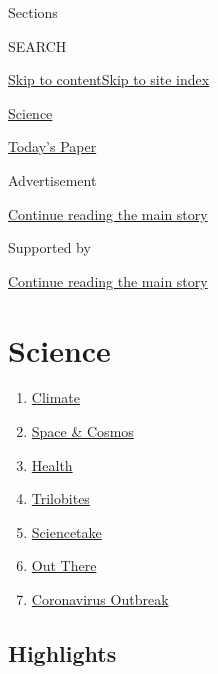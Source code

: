 Sections

SEARCH

\protect\hyperlink{site-content}{Skip to
content}\protect\hyperlink{site-index}{Skip to site index}

\href{https://www.nytimes3xbfgragh.onion/section/science}{Science}

\href{https://myaccount.nytimes3xbfgragh.onion/auth/login?response_type=cookie\&client_id=vi}{}

\href{https://www.nytimes3xbfgragh.onion/section/todayspaper}{Today's
Paper}

Advertisement

\protect\hyperlink{after-top}{Continue reading the main story}

Supported by

\protect\hyperlink{after-sponsor}{Continue reading the main story}

\hypertarget{science}{%
\section{Science}\label{science}}

\begin{enumerate}
\def\labelenumi{\arabic{enumi}.}
\tightlist
\item
  \href{/section/climate}{Climate}
\item
  \href{/section/science/space}{Space \& Cosmos}
\item
  \href{/section/health}{Health}
\item
  \href{/column/trilobites}{Trilobites}
\item
  \href{/column/sciencetake}{Sciencetake}
\item
  \href{/column/out-there}{Out There}
\item
  \href{/news-event/coronavirus}{Coronavirus Outbreak}
\end{enumerate}

\hypertarget{highlights}{%
\subsection{Highlights}\label{highlights}}

